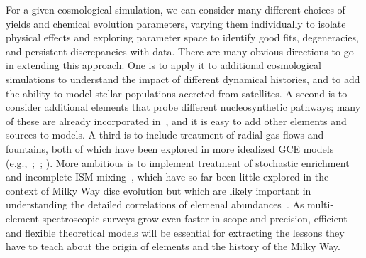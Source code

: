 \documentclass[draft2.tex]{subfiles}
\begin{document}
For a given cosmological simulation, we can consider many different choices of 
yields and chemical evolution parameters, varying them individually to isolate 
physical effects and exploring parameter space to identify good fits, 
degeneracies, and persistent discrepancies with data. 
There are many obvious directions to go in extending this approach. 
One is to apply it to additional cosmological simulations to understand the 
impact of different dynamical histories, and to add the ability to model 
stellar populations accreted from satellites. 
A second is to consider additional elements that probe different 
nucleosynthetic pathways; many of these are already incorporated in~\vice, and 
it is easy to add other elements and sources to models. 
A third is to include treatment of radial gas flows and fountains, both of 
which have been explored in more idealized GCE models (e.g.,~\citealp{Lacey1985, 
Bilitewski2012, Kubryk2015a, Kubryk2015b};~\citealp*{Spitoni2013}; 
\citealp{Pezzulli2016, Sharda2021a, Sharda2021b}). 
More ambitious is to implement treatment of stochastic enrichment and 
incomplete ISM mixing~\citep[e.g.][]{Montes2016, Krumholz2018b, Beniamini2020}, 
which have so far been little explored in the context of Milky Way disc 
evolution but which are likely important in understanding the detailed 
correlations of elemenal abundances~\citep{Ting2021}. 
As multi-element spectroscopic surveys grow even faster in scope and precision, 
efficient and flexible theoretical models will be essential for extracting the 
lessons they have to teach about the origin of elements and the history of the 
Milky Way. 
\end{document}
